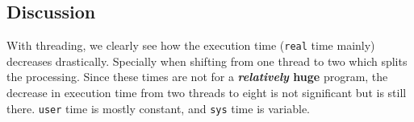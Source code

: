 \documentclass{article}
\newcommand{\code}[1]{\texttt{#1}}
\begin{document}

\vspace{0.5cm}

\subsection{Discussion}

With threading, we clearly see how the execution time (\code{real} time mainly) decreases drastically. Specially when shifting from one thread to two which splits the processing. Since these times are not for a \textbf{\textit{relatively} huge} program, the decrease in execution time from two threads to eight is not significant but is still there. \code{user} time is mostly constant, and \code{sys} time is variable.
\end{document}

